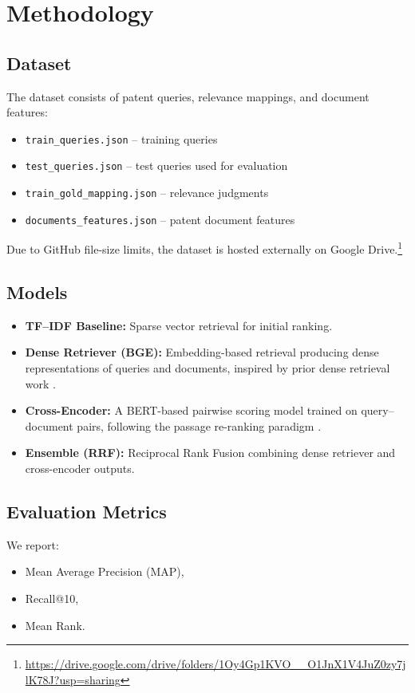 \documentclass[11pt,a4paper]{article}
\begin{document}
\section{Methodology}
\subsection{Dataset}
The dataset consists of patent queries, relevance mappings, and document features:
\begin{itemize}
    \item \texttt{train\_queries.json} – training queries
    \item \texttt{test\_queries.json} – test queries used for evaluation
    \item \texttt{train\_gold\_mapping.json} – relevance judgments
    \item \texttt{documents\_features.json} – patent document features
\end{itemize}
Due to GitHub file-size limits, the dataset is hosted externally on Google Drive.\footnote{\url{https://drive.google.com/drive/folders/1Oy4Gp1KVO__O1JnX1V4JuZ0zy7jlK78J?usp=sharing}}

\subsection{Models}
\begin{itemize}
    \item \textbf{TF--IDF Baseline:} Sparse vector retrieval for initial ranking.
    \item \textbf{Dense Retriever (BGE):} Embedding-based retrieval producing dense representations of queries and documents, inspired by prior dense retrieval work \cite{karpukhin-etal-2020-dense}.
    \item \textbf{Cross-Encoder:} A BERT-based pairwise scoring model trained on query--document pairs, following the passage re-ranking paradigm \cite{nogueira2019passage}.
    \item \textbf{Ensemble (RRF):} Reciprocal Rank Fusion combining dense retriever and cross-encoder outputs.
\end{itemize}

\subsection{Evaluation Metrics}
We report:
\begin{itemize}
    \item Mean Average Precision (MAP),
    \item Recall@10,
    \item Mean Rank.
\end{itemize}
\end{document}
